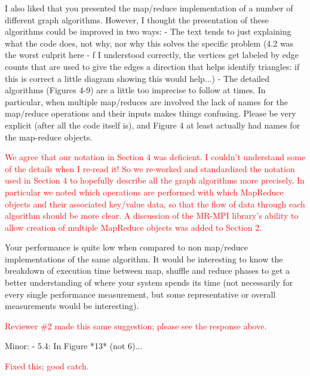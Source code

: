 \documentclass[11pt]{article}
\newcommand{\revise}[1]{\textcolor{red}{#1}}
\begin{document}
I also liked that you presented the map/reduce implementation of a
number of different graph algorithms. However, I thought the
presentation of these algorithms could be improved in two ways: - The
text tends to just explaining what the code does, not why, nor why
this solves the specific problem (4.2 was the worst culprit here - f I
understood correctly, the vertices get labeled by edge counts that are
used to give the edges a direction that helps identify triangles: if
this is correct a little diagram showing this would help...)  - The
detailed algorithms (Figures 4-9) are a little too imprecise to follow
at times. In particular, when multiple map/reduces are involved the
lack of names for the map/reduce operations and their inputs makes
things confusing. Please be very explicit (after all the code itself
is), and Figure 4 at least actually had names for the map-reduce
objects.

\revise{We agree that our notation in Section 4 was deficient.  I
  couldn't understand some of the details when I re-read it!  So we
  re-worked and standardized the notation used in Section 4 to
  hopefully describe all the graph algorithms more precisely.  In
  particular we noted which operations are performed with which
  MapReduce objects and their associated key/value data, so that the
  flow of data through each algorithm should be more clear.  A
  discussion of the MR-MPI library's ability to allow creation of
  multiple MapReduce objects was added to Section 2.}

Your performance is quite low when compared to non map/reduce
implementations of the same algorithm. It would be interesting to know the
breakdown of execution time between map, shuffle and reduce phases to get a
better understanding of where your system spends its time (not necessarily
for every single performance measurement, but some representative or
overall measurements would be interesting).

\revise{Reviewer \#2 made this same suggestion; please see the
response above.}

Minor:
- 5.4: In Figure *13* (not 6)...

\revise{Fixed this; good catch.}
\end{document}
